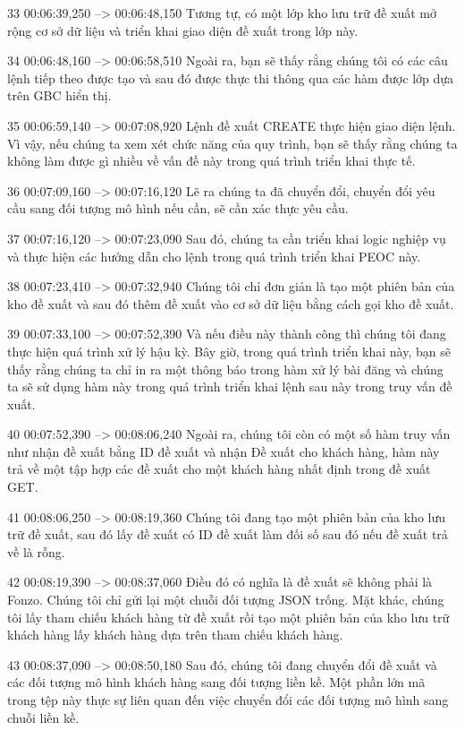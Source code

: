 33
00:06:39,250 --> 00:06:48,150
Tương tự, có một lớp kho lưu trữ đề xuất mở rộng cơ sở dữ liệu và triển khai giao diện đề xuất trong lớp này.

34
00:06:48,160 --> 00:06:58,510
Ngoài ra, bạn sẽ thấy rằng chúng tôi có các câu lệnh tiếp theo được tạo và sau đó được thực thi thông qua các hàm được lớp dựa trên GBC hiển thị.

35
00:06:59,140 --> 00:07:08,920
Lệnh đề xuất CREATE thực hiện giao diện lệnh.  Vì vậy, nếu chúng ta xem xét chức năng của quy trình, bạn sẽ thấy rằng chúng ta không làm được gì nhiều về vấn đề này trong quá trình triển khai thực tế.

36
00:07:09,160 --> 00:07:16,120
Lẽ ra chúng ta đã chuyển đổi, chuyển đổi yêu cầu sang đối tượng mô hình nếu cần, sẽ cần xác thực yêu cầu.

37
00:07:16,120 --> 00:07:23,090
Sau đó, chúng ta cần triển khai logic nghiệp vụ và thực hiện các hướng dẫn cho lệnh trong quá trình triển khai PEOC này.

38
00:07:23,410 --> 00:07:32,940
Chúng tôi chỉ đơn giản là tạo một phiên bản của kho đề xuất và sau đó thêm đề xuất vào cơ sở dữ liệu bằng cách gọi kho đề xuất.

39
00:07:33,100 --> 00:07:52,390
Và nếu điều này thành công thì chúng tôi đang thực hiện quá trình xử lý hậu kỳ.  Bây giờ, trong quá trình triển khai này, bạn sẽ thấy rằng chúng ta chỉ in ra một thông báo trong hàm xử lý bài đăng và chúng ta sẽ sử dụng hàm này trong quá trình triển khai lệnh sau này trong truy vấn đề xuất.

40
00:07:52,390 --> 00:08:06,240
Ngoài ra, chúng tôi còn có một số hàm truy vấn như nhận đề xuất bằng ID đề xuất và nhận Đề xuất cho khách hàng, hàm này trả về một tập hợp các đề xuất cho một khách hàng nhất định trong đề xuất GET.

41
00:08:06,250 --> 00:08:19,360
Chúng tôi đang tạo một phiên bản của kho lưu trữ đề xuất, sau đó lấy đề xuất có ID đề xuất làm đối số sau đó nếu đề xuất trả về là rỗng.

42
00:08:19,390 --> 00:08:37,060
Điều đó có nghĩa là đề xuất sẽ không phải là Fonzo.  Chúng tôi chỉ gửi lại một chuỗi đối tượng JSON trống.  Mặt khác, chúng tôi lấy tham chiếu khách hàng từ đề xuất rồi tạo một phiên bản của kho lưu trữ khách hàng lấy khách hàng dựa trên tham chiếu khách hàng.

43
00:08:37,090 --> 00:08:50,180
Sau đó, chúng tôi đang chuyển đổi đề xuất và các đối tượng mô hình khách hàng sang đối tượng liền kề.  Một phần lớn mã trong tệp này thực sự liên quan đến việc chuyển đổi các đối tượng mô hình sang chuỗi liền kề.

